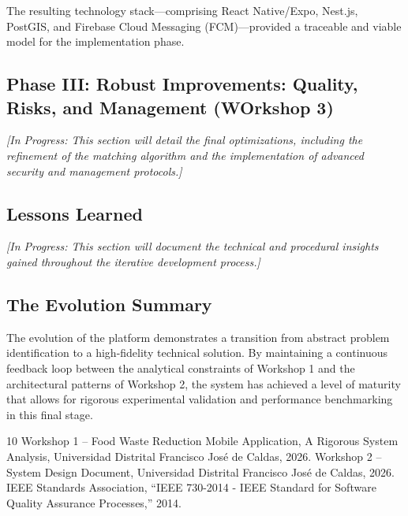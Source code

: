 \documentclass[9pt,conference]{IEEEtran}
\begin{document}
The resulting technology stack—comprising React Native/Expo, Nest.js, PostGIS, and Firebase Cloud Messaging (FCM)—provided a traceable and viable model for the implementation phase.

\subsection{Phase III: Robust Improvements: Quality, Risks, and Management (WOrkshop 3)}
\textit{[In Progress: This section will detail the final optimizations, including the refinement of the matching algorithm and the implementation of advanced security and management protocols.]}

\subsection{Lessons Learned}
\textit{[In Progress: This section will document the technical and procedural insights gained throughout the iterative development process.]}

\subsection{The Evolution Summary}
The evolution of the platform demonstrates a transition from abstract problem identification to a high-fidelity technical solution. By maintaining a continuous feedback loop between the analytical constraints of Workshop 1 and the architectural patterns of Workshop 2, the system has achieved a level of maturity that allows for rigorous experimental validation and performance benchmarking in this final stage.

\begin{thebibliography}{10}
 Workshop 1 – Food Waste Reduction Mobile Application, A Rigorous System Analysis, Universidad Distrital Francisco José de Caldas, 2026.
 Workshop 2 – System Design Document, Universidad Distrital Francisco José de Caldas, 2026.
 IEEE Standards Association, ``IEEE 730-2014 - IEEE Standard for Software Quality Assurance Processes,'' 2014.
\end{thebibliography}
\end{document}
